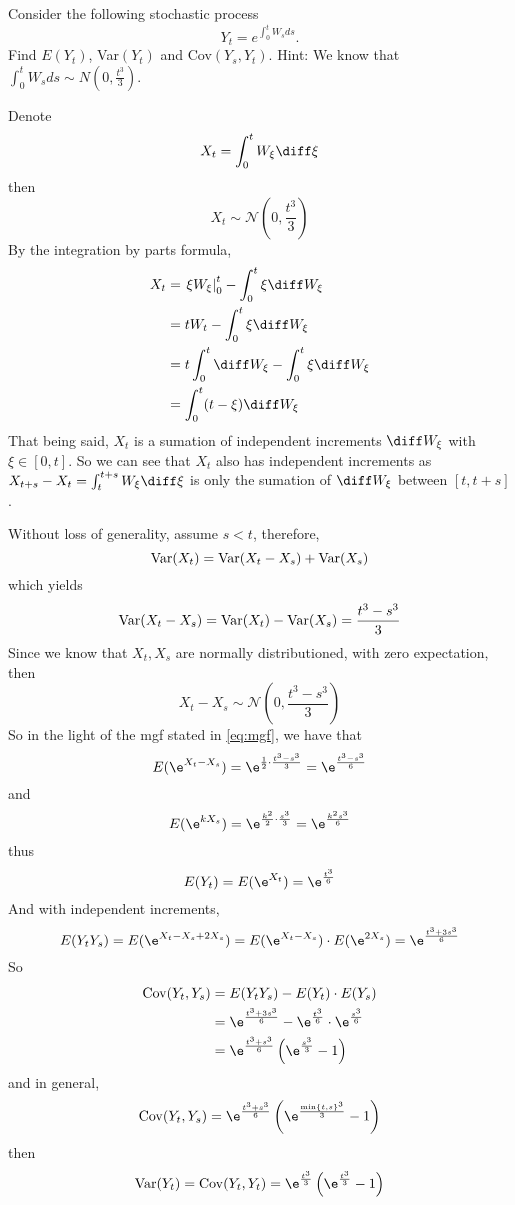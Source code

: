     \problem
    \begin{question}
        Consider the following stochastic process
        \[Y_t=e^{\int_0^t W_sds}.\]
        Find $E(Y_t)$, Var$(Y_t)$ and Cov$(Y_s,Y_t)$. 
        Hint:  We know that $\int_0^t W_sds\sim N(0,\frac{t^3}{3})$.
    \end{question}
    Denote
    \[X_t=\int_0^tW_\xi\diff\xi\]
    then
    \[X_t\sim\mathcal N\left(0,\frac{t^3}{3}\right)\]
    By the integration by parts formula,
    \[\begin{aligned}
        X_t&=\left.\xi W_\xi\right|^t_0-\int_0^t\xi\diff W_\xi\\
        &=tW_t-\int_0^t\xi\diff W_\xi\\
        &=t\int_0^t\diff W_\xi-\int_0^t\xi\diff W_\xi\\
        &=\int_0^t(t-\xi)\diff W_\xi
    \end{aligned}\]
    That being said, $X_t$ is a sumation of independent increments
    $\diff W_\xi$ with $\xi\in[0,t]$. So we can see that $X_t$
    also has independent increments as
    $X_{t+s}-X_t=\int_t^{t+s}W_\xi\diff\xi$
    is only the
    sumation of $\diff W_\xi$ between $[t,t+s]$.

    Without loss of generality, assume $s<t$,
    therefore,
    \[\mathrm{Var}(X_t)=\mathrm{Var}(X_t-X_s)+\mathrm{Var}(X_s)\]
    which yields
    \[\mathrm{Var}(X_t-X_s)=\mathrm{Var}(X_t)-\mathrm{Var}(X_s)=\frac{t^3-s^3}{3}\]
    Since we know that $X_t,X_s$ are normally distributioned,
    with zero expectation, then
    \[X_t-X_s\sim\mathcal N\left(0,\frac{t^3-s^3}{3}\right)\]
    So in the light of the mgf stated in \cref{eq:mgf}, we have that
    \[E(\e^{X_t-X_s})=\e^{\frac{1}{2}\cdot\frac{t^3-s^3}{3}}
    =\e^{\frac{t^3-s^3}{6}}\]
    and
    \[E(\e^{kX_s})=\e^{\frac{k^2}{2}\cdot\frac{s^3}{3}}
    =\e^{\frac{k^2s^3}{6}}\]
    thus
    \[E(Y_t)=E(\e^{X_t})=\e^{\frac{t^3}{6}}\]
    And with independent increments,
    \[E(Y_tY_s)=E(\e^{X_t-X_s+2X_s})
    =E(\e^{X_t-X_s})\cdot E(\e^{2X_s})
    =\e^{\frac{t^3+3s^3}{6}}\]
    So
    \[\begin{aligned}
        \cov(Y_t,Y_s)&=E(Y_tY_s)-E(Y_t)\cdot E(Y_s)\\
        &=\e^{\frac{t^3+3s^3}{6}}-\e^{\frac{t^3}{6}}\cdot\e^\frac{s^3}{6}\\
        &=\e^{\frac{t^3+s^3}{6}}\left(\e^{\frac{s^3}{3}}-1\right)
    \end{aligned}\]
    and in general,
    \[\cov(Y_t,Y_s)=\e^{\frac{t^3+s^3}{6}}
    \left(\e^{\frac{\min\{t,s\}^3}{3}}-1\right)\]
    then
    \[\var(Y_t)=\cov(Y_t,Y_t)
    =\e^{\frac{t^3}{3}}\left(\e^{\frac{t^3}{3}}-1\right)\]

